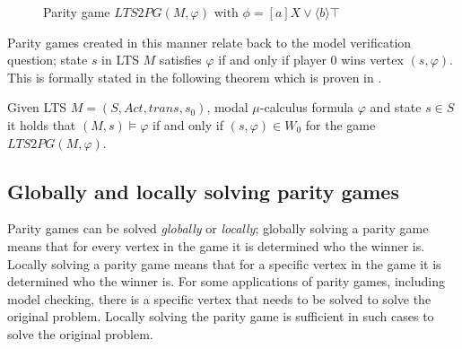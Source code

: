 \begin{example}
\begin{figure}[h]
		
		\caption[Parity game $LTS2PG(M, \varphi)$]{Parity game $LTS2PG(M, \varphi)$ with $\phi = [a] X \vee \langle b \rangle \top$}
		\label{fig:exverpg}
	\end{figure}
\end{example}

Parity games created in this manner relate back to the model verification question; state $s$ in LTS $M$ satisfies $\varphi$ if and only if player $0$ wins vertex $(s, \varphi)$. This is formally stated in the following theorem which is proven in \cite{Bradfield2018}.
\begin{theorem}
	\label{the_LTS_PG_REL}Given LTS $M = (S, Act, trans, s_0)$, modal $\mu$-calculus formula $\varphi$ and state $s \in S$ it holds that $(M, s) \models \varphi$ if and only if $(s,\varphi) \in W_0$ for the game $LTS2PG(M, \varphi)$.
\end{theorem}

\subsection{Globally and locally solving parity games}
Parity games can be solved \textit{globally} or \textit{locally}; globally solving a parity game means that for every vertex in the game it is determined who the winner is. Locally solving a parity game means that for a specific vertex in the game it is determined who the winner is. For some applications of parity games, including model checking, there is a specific vertex that needs to be solved to solve the original problem. Locally solving the parity game is sufficient in such cases to solve the original problem.

